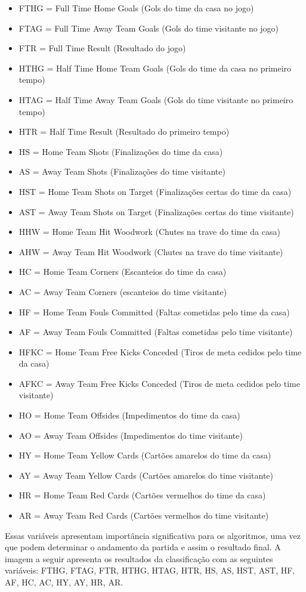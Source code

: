 \begin{itemize}
	\item FTHG = Full Time Home Goals (Gols do time da casa no jogo)
	\item FTAG = Full Time Away Team Goals (Gols do time visitante no jogo)
	\item FTR = Full Time Result (Resultado do jogo)
	\item HTHG = Half Time Home Team Goals (Gols do time da casa no primeiro tempo)
	\item HTAG = Half Time Away Team Goals (Gols do time visitante no primeiro tempo)
	\item HTR = Half Time Result (Resultado do primeiro tempo)
	\item HS = Home Team Shots (Finalizações do time da casa)
	\item AS = Away Team Shots (Finalizações do time visitante)
	\item HST = Home Team Shots on Target (Finalizações certas do time da casa)
	\item AST = Away Team Shots on Target (Finalizações certas do time visitante)
	\item HHW = Home Team Hit Woodwork (Chutes na trave do time da casa)
	\item AHW = Away Team Hit Woodwork (Chutes na trave do time visitante)
	\item HC = Home Team Corners (Escanteios do time da casa)
	\item AC = Away Team Corners (escanteios do time visitante)
	\item HF = Home Team Fouls Committed (Faltas cometidas pelo time da casa)
	\item AF = Away Team Fouls Committed (Faltas cometidas pelo time visitante)
	\item HFKC = Home Team Free Kicks Conceded (Tiros de meta cedidos pelo time da casa)
	\item AFKC = Away Team Free Kicks Conceded (Tiros de meta cedidos pelo time visitante)
	\item HO = Home Team Offsides (Impedimentos do time da casa)
	\item AO = Away Team Offsides (Impedimentos do time visitante)
	\item HY = Home Team Yellow Cards (Cartões amarelos do time da casa)
	\item AY = Away Team Yellow Cards (Cartões amarelos do time visitante)
	\item HR = Home Team Red Cards (Cartões vermelhos do time da casa)
	\item AR = Away Team Red Cards (Cartões vermelhos do time visitante)
\end{itemize}
Essas variáveis apresentam importância significativa para os algoritmos, uma vez que podem determinar o andamento da partida e assim o resultado final.
A imagem a seguir apresenta os resultados da classificação com as seguintes variáveis: FTHG, FTAG, FTR, HTHG, HTAG, HTR, HS, AS, HST, AST, HF, AF, HC, AC, HY, AY, HR, AR.

